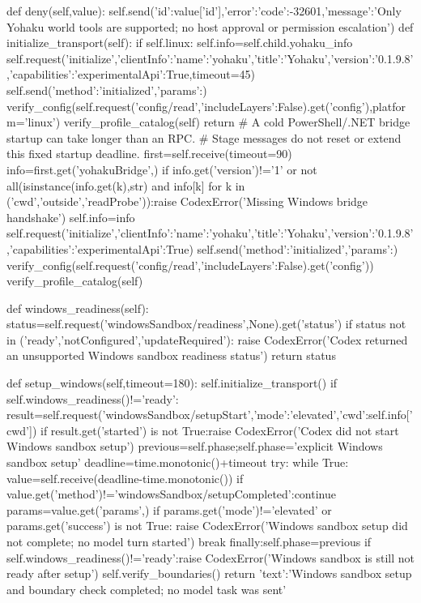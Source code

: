     def deny(self,value):
        self.send({'id':value['id'],'error':{'code':-32601,'message':'Only Yohaku world tools are supported; no host approval or permission escalation'}})
    def initialize_transport(self):
        if self.linux:
            self.info=self.child.yohaku_info
            self.request('initialize',{'clientInfo':{'name':'yohaku','title':'Yohaku','version':'0.1.9.8'},'capabilities':{'experimentalApi':True}},timeout=45)
            self.send({'method':'initialized','params':{}})
            verify_config(self.request('config/read',{'includeLayers':False}).get('config'),platform='linux')
            verify_profile_catalog(self)
            return
        # A cold PowerShell/.NET bridge startup can take longer than an RPC.
        # Stage messages do not reset or extend this fixed startup deadline.
        first=self.receive(timeout=90)
        info=first.get('yohakuBridge',{})
        if info.get('version')!='1' or not all(isinstance(info.get(k),str) and info[k] for k in ('cwd','outside','readProbe')):raise CodexError('Missing Windows bridge handshake')
        self.info=info
        self.request('initialize',{'clientInfo':{'name':'yohaku','title':'Yohaku','version':'0.1.9.8'},'capabilities':{'experimentalApi':True}})
        self.send({'method':'initialized','params':{}})
        verify_config(self.request('config/read',{'includeLayers':False}).get('config'))
        verify_profile_catalog(self)

    def windows_readiness(self):
        status=self.request('windowsSandbox/readiness',None).get('status')
        if status not in ('ready','notConfigured','updateRequired'):
            raise CodexError('Codex returned an unsupported Windows sandbox readiness status')
        return status

    def setup_windows(self,timeout=180):
        self.initialize_transport()
        if self.windows_readiness()!='ready':
            result=self.request('windowsSandbox/setupStart',{'mode':'elevated','cwd':self.info['cwd']})
            if result.get('started') is not True:raise CodexError('Codex did not start Windows sandbox setup')
            previous=self.phase;self.phase='explicit Windows sandbox setup'
            deadline=time.monotonic()+timeout
            try:
                while True:
                    value=self.receive(deadline-time.monotonic())
                    if value.get('method')!='windowsSandbox/setupCompleted':continue
                    params=value.get('params',{})
                    if params.get('mode')!='elevated' or params.get('success') is not True:
                        raise CodexError('Windows sandbox setup did not complete; no model turn started')
                    break
            finally:self.phase=previous
            if self.windows_readiness()!='ready':raise CodexError('Windows sandbox is still not ready after setup')
        self.verify_boundaries()
        return {'text':'Windows sandbox setup and boundary check completed; no model task was sent'}

